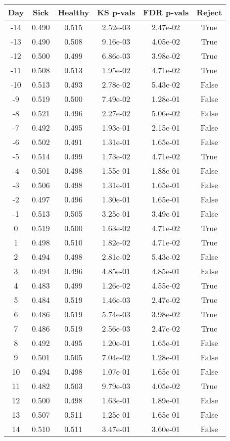 \begin{tabular}{c|c|c|c|c|c}
Day &  Sick & Healthy &  KS p-vals & FDR p-vals & Reject\\
\hline
-14 & 0.490 &   0.515 &   2.52e-03 &   2.47e-02 &   True\\
-13 & 0.490 &   0.508 &   9.16e-03 &   4.05e-02 &   True\\
-12 & 0.500 &   0.499 &   6.86e-03 &   3.98e-02 &   True\\
-11 & 0.508 &   0.513 &   1.95e-02 &   4.71e-02 &   True\\
-10 & 0.513 &   0.493 &   2.78e-02 &   5.43e-02 &  False\\
 -9 & 0.519 &   0.500 &   7.49e-02 &   1.28e-01 &  False\\
 -8 & 0.521 &   0.496 &   2.27e-02 &   5.06e-02 &  False\\
 -7 & 0.492 &   0.495 &   1.93e-01 &   2.15e-01 &  False\\
 -6 & 0.502 &   0.491 &   1.31e-01 &   1.65e-01 &  False\\
 -5 & 0.514 &   0.499 &   1.73e-02 &   4.71e-02 &   True\\
 -4 & 0.501 &   0.498 &   1.55e-01 &   1.88e-01 &  False\\
 -3 & 0.506 &   0.498 &   1.31e-01 &   1.65e-01 &  False\\
 -2 & 0.497 &   0.496 &   1.30e-01 &   1.65e-01 &  False\\
 -1 & 0.513 &   0.505 &   3.25e-01 &   3.49e-01 &  False\\
  0 & 0.519 &   0.500 &   1.63e-02 &   4.71e-02 &   True\\
  1 & 0.498 &   0.510 &   1.82e-02 &   4.71e-02 &   True\\
  2 & 0.494 &   0.498 &   2.81e-02 &   5.43e-02 &  False\\
  3 & 0.494 &   0.496 &   4.85e-01 &   4.85e-01 &  False\\
  4 & 0.483 &   0.499 &   1.26e-02 &   4.55e-02 &   True\\
  5 & 0.484 &   0.519 &   1.46e-03 &   2.47e-02 &   True\\
  6 & 0.486 &   0.519 &   5.74e-03 &   3.98e-02 &   True\\
  7 & 0.486 &   0.519 &   2.56e-03 &   2.47e-02 &   True\\
  8 & 0.492 &   0.495 &   1.20e-01 &   1.65e-01 &  False\\
  9 & 0.501 &   0.505 &   7.04e-02 &   1.28e-01 &  False\\
 10 & 0.494 &   0.498 &   1.07e-01 &   1.65e-01 &  False\\
 11 & 0.482 &   0.503 &   9.79e-03 &   4.05e-02 &   True\\
 12 & 0.500 &   0.498 &   1.63e-01 &   1.89e-01 &  False\\
 13 & 0.507 &   0.511 &   1.25e-01 &   1.65e-01 &  False\\
 14 & 0.510 &   0.511 &   3.47e-01 &   3.60e-01 &  False\\
\end{tabular}